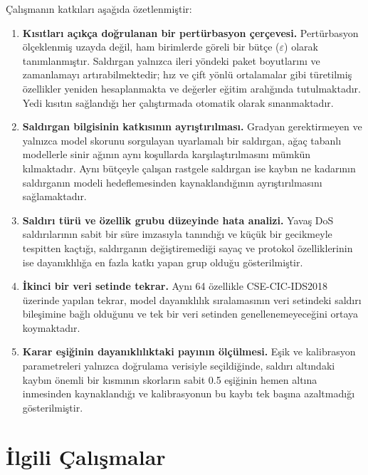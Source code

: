 \documentclass[conference]{IEEEtran}
\begin{document}
Çalışmanın katkıları aşağıda özetlenmiştir:
\begin{enumerate}
\item \textbf{Kısıtları açıkça doğrulanan bir pertürbasyon çerçevesi.} Pertürbasyon ölçeklenmiş uzayda değil, ham birimlerde göreli bir bütçe ($\varepsilon$) olarak tanımlanmıştır. Saldırgan yalnızca ileri yöndeki paket boyutlarını ve zamanlamayı artırabilmektedir; hız ve çift yönlü ortalamalar gibi türetilmiş özellikler yeniden hesaplanmakta ve değerler eğitim aralığında tutulmaktadır. Yedi kısıtın sağlandığı her çalıştırmada otomatik olarak sınanmaktadır.
\item \textbf{Saldırgan bilgisinin katkısının ayrıştırılması.} Gradyan gerektirmeyen ve yalnızca model skorunu sorgulayan uyarlamalı bir saldırgan, ağaç tabanlı modellerle sinir ağının aynı koşullarda karşılaştırılmasını mümkün kılmaktadır. Aynı bütçeyle çalışan rastgele saldırgan ise kaybın ne kadarının saldırganın modeli hedeflemesinden kaynaklandığının ayrıştırılmasını sağlamaktadır.
\item \textbf{Saldırı türü ve özellik grubu düzeyinde hata analizi.} Yavaş DoS saldırılarının sabit bir süre imzasıyla tanındığı ve küçük bir gecikmeyle tespitten kaçtığı, saldırganın değiştiremediği sayaç ve protokol özelliklerinin ise dayanıklılığa en fazla katkı yapan grup olduğu gösterilmiştir.
\item \textbf{İkinci bir veri setinde tekrar.} Aynı 64 özellikle CSE-CIC-IDS2018 üzerinde yapılan tekrar, model dayanıklılık sıralamasının veri setindeki saldırı bileşimine bağlı olduğunu ve tek bir veri setinden genellenemeyeceğini ortaya koymaktadır.
\item \textbf{Karar eşiğinin dayanıklılıktaki payının ölçülmesi.} Eşik ve kalibrasyon parametreleri yalnızca doğrulama verisiyle seçildiğinde, saldırı altındaki kaybın önemli bir kısmının skorların sabit 0.5 eşiğinin hemen altına inmesinden kaynaklandığı ve kalibrasyonun bu kaybı tek başına azaltmadığı gösterilmiştir.
\end{enumerate}

\section{İlgili Çalışmalar}
\end{document}
